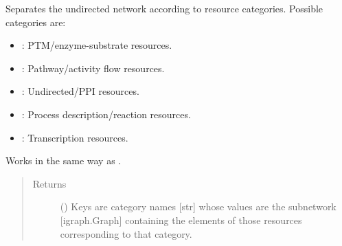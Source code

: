 \documentclass[letterpaper,10pt,english]{sphinxmanual}
\begin{document}
\begin{fulllineitems}
\begin{fulllineitems}
\begin{quote}
\begin{description}
\end{description}\end{quote}

\end{fulllineitems}


\begin{fulllineitems}
\label{\detokenize{main:pypath.main.PyPath.separate_by_category}}
Separates the undirected network according to resource
categories. Possible categories are:
\begin{itemize}
\item {} 
: PTM/enzyme-substrate resources.

\item {} 
: Pathway/activity flow resources.

\item {} 
: Undirected/PPI resources.

\item {} 
: Process description/reaction resources.

\item {} 
: Transcription resources.

\end{itemize}

Works in the same way as {\hyperref[\detokenize{main:pypath.main.PyPath.separate}]{}}.
\begin{quote}\begin{description}
\item[{Returns}] \leavevmode
() \textendash{} Keys are category names {[}str{]} whose values are
the subnetwork {[}igraph.Graph{]} containing the elements of
those resources corresponding to that category.

\end{description}\end{quote}

\end{fulllineitems}


\begin{fulllineitems}
\label{\detokenize{main:pypath.main.PyPath.sequences}}
\end{fulllineitems}


\end{fulllineitems}
\end{document}
